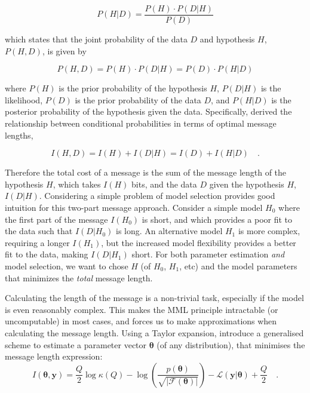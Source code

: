 \documentclass{aastex61}
\newcommand{\vect}[1]{\boldsymbol{\mathbf{#1}}}
\def\vectheta{\vect{\theta}}
\def\datum{y}
\def\data{\vect{\datum}}
\def\likelihood{\mathcal{L}}
\begin{document}
\begin{equation}
  P(H|D) = \frac{P(H)\cdot{}P(D|H)}{P(D)}
\end{equation}

\noindent{}which states that the joint probability of the data $D$ and 
hypothesis $H$, $P(H,D)$, is given by

\begin{equation}
  P(H,D) = P(H) \cdot P(D|H) = P(D) \cdot P(H|D)
\end{equation}

\noindent{}where $P(H)$ is the prior probability of the hypothesis $H$,
$P(D|H)$ is the likelihood, $P(D)$ is the prior probability of the data $D$,
and $P(H|D)$ is the posterior probability of the hypothesis given the data.
Specifically, \citet{Wallace_1968} derived the relationship between
conditional probabilities in terms of optimal message lengths,

\begin{equation}
  I(H,D) = I(H) + I(D|H) = I(D) + I(H|D) \quad .
  \label{eq:mml-wallace}
\end{equation}

Therefore the total cost of a message is the sum of the message length of the
hypothesis $H$, which takes $I(H)$ bits, and the data $D$ given the hypothesis
$H$, $I(D|H)$. 
Considering a simple problem of model selection provides good intuition for
this two-part message approach. 
Consider a simple model $H_0$ where the first part of the message $I(H_0)$ is 
short, and which provides a poor fit to the data such that $I(D|H_0)$ is long.
An alternative model $H_1$ is more complex, requiring a longer $I(H_1)$, but
the increased model flexibility provides a better fit to the data, making
$I(D|H_1)$ short.
For both parameter estimation \emph{and} model selection, we want to chose
$H$ (of $H_0$, $H_1$, etc) and the model parameters that minimizes the
\emph{total} message length.



Calculating the length of the message is a non-trivial task, especially if the
model is even reasonably complex.
This makes the MML principle intractable (or uncomputable) in most cases, and
forces us to make approximations when calculating the message length.
Using a Taylor expansion, \citet{Wallace_1987} introduce a generalised 
scheme to estimate a parameter vector $\vectheta$ (of any distribution), that
minimises the message length expression:
\begin{equation}
\label{eq:message-length}
  I(\vectheta,\data) 
    = \frac{Q}{2}\log\kappa{\left(Q\right)} 
    - \log{\left(\frac{p(\vectheta)}{\sqrt{|\mathcal{F}(\vectheta)|}}\right)}
    - \likelihood\left(\data|\vectheta\right) 
    + \frac{Q}{2} \quad .
\end{equation}
\end{document}
